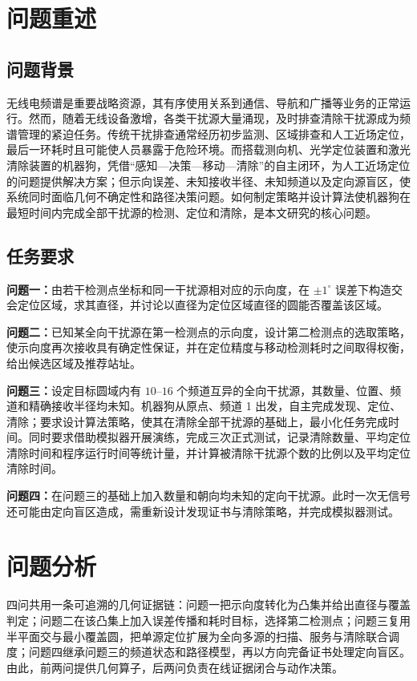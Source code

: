 \section{问题重述}

\subsection{问题背景}
无线电频谱是重要战略资源，其有序使用关系到通信、导航和广播等业务的正常运行。然而，随着无线设备激增，各类干扰源大量涌现，及时排查清除干扰源成为频谱管理的紧迫任务\cite{wang2019}。传统干扰排查通常经历初步监测、区域排查和人工近场定位，最后一环耗时且可能使人员暴露于危险环境。而搭载测向机、光学定位装置和激光清除装置的机器狗，凭借“感知—决策—移动—清除”的自主闭环，为人工近场定位的问题提供解决方案；但示向误差、未知接收半径、未知频道以及定向源盲区，使系统同时面临几何不确定性和路径决策问题。如何制定策略并设计算法使机器狗在最短时间内完成全部干扰源的检测、定位和清除，是本文研究的核心问题。

\subsection{任务要求}
\textbf{问题一：}由若干检测点坐标和同一干扰源相对应的示向度，在 $\pm1^\circ$ 误差下构造交会定位区域，求其直径，并讨论以直径为定位区域直径的圆能否覆盖该区域。

\textbf{问题二：}已知某全向干扰源在第一检测点的示向度，设计第二检测点的选取策略，使示向度再次接收具有确定性保证，并在定位精度与移动检测耗时之间取得权衡，给出候选区域及推荐站址。

\textbf{问题三：}设定目标圆域内有 $10$--$16$ 个频道互异的全向干扰源，其数量、位置、频道和精确接收半径均未知。机器狗从原点、频道 1 出发，自主完成发现、定位、清除；要求设计算法策略，使其在清除全部干扰源的基础上，最小化任务完成时间。同时要求借助模拟器开展演练，完成三次正式测试，记录清除数量、平均定位清除时间和程序运行时间等统计量，并计算被清除干扰源个数的比例以及平均定位清除时间。

\textbf{问题四：}在问题三的基础上加入数量和朝向均未知的定向干扰源。此时一次无信号还可能由定向盲区造成，需重新设计发现证书与清除策略，并完成模拟器测试。

\section{问题分析}

四问共用一条可追溯的几何证据链：问题一把示向度转化为凸集并给出直径与覆盖判定；问题二在该凸集上加入误差传播和耗时目标，选择第二检测点；问题三复用半平面交与最小覆盖圆，把单源定位扩展为全向多源的扫描、服务与清除联合调度；问题四继承问题三的频道状态和路径模型，再以方向完备证书处理定向盲区。由此，前两问提供几何算子，后两问负责在线证据闭合与动作决策。

